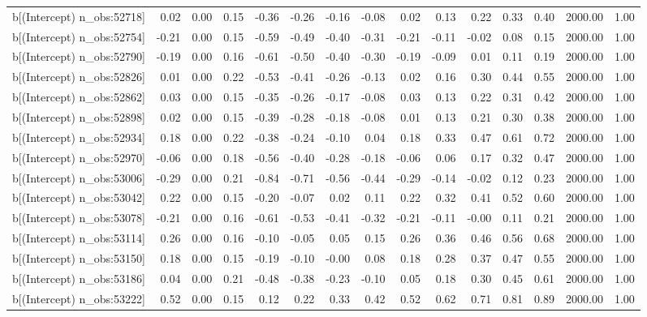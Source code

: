 \begin{table}[ht]
\begin{tabular}{rrrrrrrrrrrrrrr}
  b[(Intercept) n\_obs:52718] & 0.02 & 0.00 & 0.15 & -0.36 & -0.26 & -0.16 & -0.08 & 0.02 & 0.13 & 0.22 & 0.33 & 0.40 & 2000.00 & 1.00 \\ 
  b[(Intercept) n\_obs:52754] & -0.21 & 0.00 & 0.15 & -0.59 & -0.49 & -0.40 & -0.31 & -0.21 & -0.11 & -0.02 & 0.08 & 0.15 & 2000.00 & 1.00 \\ 
  b[(Intercept) n\_obs:52790] & -0.19 & 0.00 & 0.16 & -0.61 & -0.50 & -0.40 & -0.30 & -0.19 & -0.09 & 0.01 & 0.11 & 0.19 & 2000.00 & 1.00 \\ 
  b[(Intercept) n\_obs:52826] & 0.01 & 0.00 & 0.22 & -0.53 & -0.41 & -0.26 & -0.13 & 0.02 & 0.16 & 0.30 & 0.44 & 0.55 & 2000.00 & 1.00 \\ 
  b[(Intercept) n\_obs:52862] & 0.03 & 0.00 & 0.15 & -0.35 & -0.26 & -0.17 & -0.08 & 0.03 & 0.13 & 0.22 & 0.31 & 0.42 & 2000.00 & 1.00 \\ 
  b[(Intercept) n\_obs:52898] & 0.02 & 0.00 & 0.15 & -0.39 & -0.28 & -0.18 & -0.08 & 0.01 & 0.13 & 0.21 & 0.30 & 0.38 & 2000.00 & 1.00 \\ 
  b[(Intercept) n\_obs:52934] & 0.18 & 0.00 & 0.22 & -0.38 & -0.24 & -0.10 & 0.04 & 0.18 & 0.33 & 0.47 & 0.61 & 0.72 & 2000.00 & 1.00 \\ 
  b[(Intercept) n\_obs:52970] & -0.06 & 0.00 & 0.18 & -0.56 & -0.40 & -0.28 & -0.18 & -0.06 & 0.06 & 0.17 & 0.32 & 0.47 & 2000.00 & 1.00 \\ 
  b[(Intercept) n\_obs:53006] & -0.29 & 0.00 & 0.21 & -0.84 & -0.71 & -0.56 & -0.44 & -0.29 & -0.14 & -0.02 & 0.12 & 0.23 & 2000.00 & 1.00 \\ 
  b[(Intercept) n\_obs:53042] & 0.22 & 0.00 & 0.15 & -0.20 & -0.07 & 0.02 & 0.11 & 0.22 & 0.32 & 0.41 & 0.52 & 0.60 & 2000.00 & 1.00 \\ 
  b[(Intercept) n\_obs:53078] & -0.21 & 0.00 & 0.16 & -0.61 & -0.53 & -0.41 & -0.32 & -0.21 & -0.11 & -0.00 & 0.11 & 0.21 & 2000.00 & 1.00 \\ 
  b[(Intercept) n\_obs:53114] & 0.26 & 0.00 & 0.16 & -0.10 & -0.05 & 0.05 & 0.15 & 0.26 & 0.36 & 0.46 & 0.56 & 0.68 & 2000.00 & 1.00 \\ 
  b[(Intercept) n\_obs:53150] & 0.18 & 0.00 & 0.15 & -0.19 & -0.10 & -0.00 & 0.08 & 0.18 & 0.28 & 0.37 & 0.47 & 0.55 & 2000.00 & 1.00 \\ 
  b[(Intercept) n\_obs:53186] & 0.04 & 0.00 & 0.21 & -0.48 & -0.38 & -0.23 & -0.10 & 0.05 & 0.18 & 0.30 & 0.45 & 0.61 & 2000.00 & 1.00 \\ 
  b[(Intercept) n\_obs:53222] & 0.52 & 0.00 & 0.15 & 0.12 & 0.22 & 0.33 & 0.42 & 0.52 & 0.62 & 0.71 & 0.81 & 0.89 & 2000.00 & 1.00 \\ 

\end{tabular}
\end{table}

